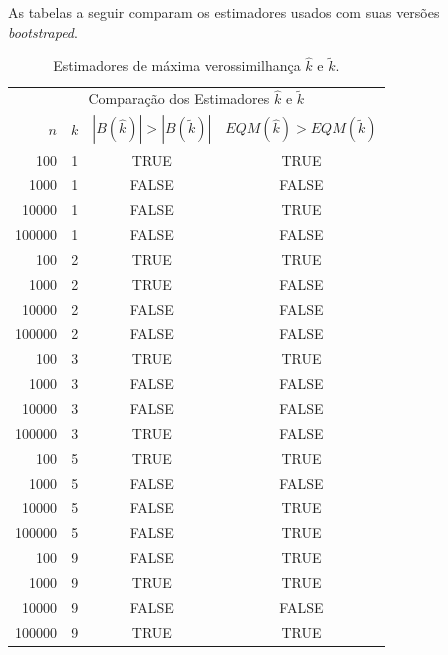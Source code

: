 \documentclass[12pt]{article}
\begin{document}
As tabelas a seguir comparam os estimadores usados com suas versões
\textit{bootstraped}. 

\begin{table}[H]
  
  \label{tab:gamma_r_mv}
  \centering
  \begin{tabular}{rccc}
    \toprule
    \multicolumn{4}{c}{Comparação dos Estimadores $\hat{k}$ e $\tilde{k}$}\\
    $n$ & $k$ & $|B(\hat{k})|>|B(\tilde{k})|$ & $EQM(\hat{k})>EQM(\tilde{k})$ \\
    \midrule
    100 & 1 & TRUE & TRUE\\
    1000 & 1 & FALSE & FALSE\\
    10000 & 1 & FALSE & TRUE\\
    100000 & 1 & FALSE & FALSE\\
    100 & 2 & TRUE & TRUE\\
    1000 & 2 & TRUE & FALSE\\
    10000 & 2 & FALSE & FALSE\\
    100000 & 2 & FALSE & FALSE\\
    100 & 3 & TRUE & TRUE\\
    1000 & 3 & FALSE & FALSE\\
    10000 & 3 & FALSE & FALSE\\
    100000 & 3 & TRUE & FALSE\\
    100 & 5 & TRUE & TRUE\\
    1000 & 5 & FALSE & FALSE\\
    10000 & 5 & FALSE & TRUE\\
    100000 & 5 & FALSE & TRUE\\
    100 & 9 & FALSE & TRUE\\
    1000 & 9 & TRUE & TRUE\\
    10000 & 9 & FALSE & FALSE\\
    100000 & 9 & TRUE & TRUE\\
    \bottomrule
  \end{tabular}
  \caption{Estimadores de máxima verossimilhança $\hat{k}$ e $\tilde{k}$.}
\end{table}
\end{document}
